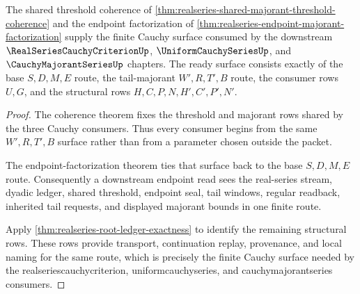 \begin{theorem}
\label{thm:realseries-cauchy-consumer-readiness}
The shared threshold coherence of \autoref{thm:realseries-shared-majorant-threshold-coherence} and the endpoint factorization of \autoref{thm:realseries-endpoint-majorant-factorization} supply the finite Cauchy surface consumed by the downstream $\RealSeriesCauchyCriterionUp$, $\UniformCauchySeriesUp$, and $\CauchyMajorantSeriesUp$ chapters. The ready surface consists exactly of the base $S,D,M,E$ route, the tail-majorant $W',R,T',B$ route, the consumer rows $U,G$, and the structural rows $H,C,P,N,H',C',P',N'$.
\end{theorem}
\begin{proof}
The coherence theorem fixes the threshold and majorant rows shared by the three Cauchy consumers. Thus every consumer begins from the same $W',R,T',B$ surface rather than from a parameter chosen outside the packet.

The endpoint-factorization theorem ties that surface back to the base $S,D,M,E$ route. Consequently a downstream endpoint read sees the real-series stream, dyadic ledger, shared threshold, endpoint seal, tail windows, regular readback, inherited tail requests, and displayed majorant bounds in one finite route.

Apply \autoref{thm:realseries-root-ledger-exactness} to identify the remaining structural rows. These rows provide transport, continuation replay, provenance, and local naming for the same route, which is precisely the finite Cauchy surface needed by the realseriescauchycriterion, uniformcauchyseries, and cauchymajorantseries consumers.
\end{proof}

